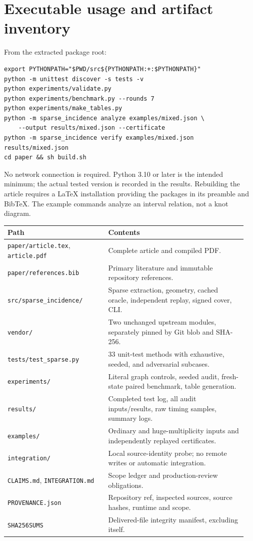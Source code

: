 \documentclass[11pt,letterpaper]{article}
\newcommand{\code}[1]{\nolinkurl{#1}}
\begin{document}
\section{Executable usage and artifact inventory}
\label{sec:artifacts}
From the extracted package root:
\begin{lstlisting}
export PYTHONPATH="$PWD/src${PYTHONPATH:+:$PYTHONPATH}"
python -m unittest discover -s tests -v
python experiments/validate.py
python experiments/benchmark.py --rounds 7
python experiments/make_tables.py
python -m sparse_incidence analyze examples/mixed.json \
    --output results/mixed.json --certificate
python -m sparse_incidence verify examples/mixed.json results/mixed.json
cd paper && sh build.sh
\end{lstlisting}
No network connection is required. Python 3.10 or later is the intended minimum;
the actual tested version is recorded in the results. Rebuilding the article
requires a LaTeX installation providing the packages in its preamble and BibTeX.
The example commands analyze an interval relation, not a knot diagram.

\begin{longtable}{@{}p{0.40\linewidth}p{0.55\linewidth}@{}}
\toprule
Path & Contents\\
\midrule
\endhead
\code{paper/article.tex}, \code{article.pdf} & Complete article and compiled PDF.\\
\code{paper/references.bib} & Primary literature and immutable repository references.\\
\code{src/sparse_incidence/} & Sparse extraction, geometry, cached oracle, independent replay, signed cover, CLI.\\
\code{vendor/} & Two unchanged upstream modules, separately pinned by Git blob and SHA-256.\\
\code{tests/test_sparse.py} & 33 unit-test methods with exhaustive, seeded, and adversarial subcases.\\
\code{experiments/} & Literal graph controls, seeded audit, fresh-state paired benchmark, table generation.\\
\code{results/} & Completed test log, all audit inputs/results, raw timing samples, summary logs.\\
\code{examples/} & Ordinary and huge-multiplicity inputs and independently replayed certificates.\\
\code{integration/} & Local source-identity probe; no remote writes or automatic integration.\\
\code{CLAIMS.md}, \code{INTEGRATION.md} & Scope ledger and production-review obligations.\\
\code{PROVENANCE.json} & Repository ref, inspected sources, source hashes, runtime and scope.\\
\code{SHA256SUMS} & Delivered-file integrity manifest, excluding itself.\\
\bottomrule
\end{longtable}
\end{document}
